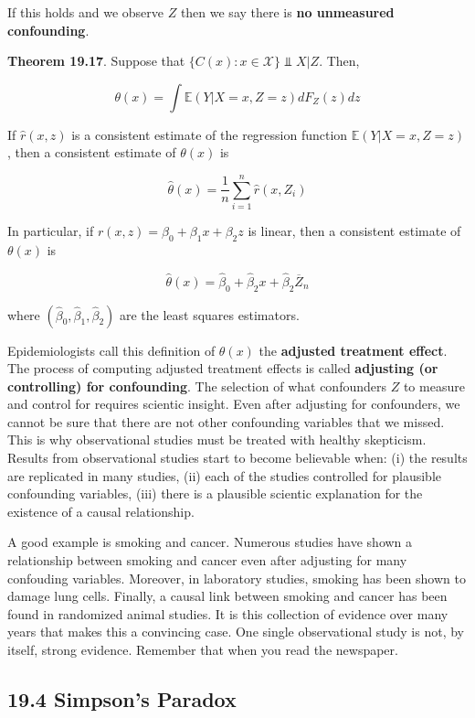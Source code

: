 If this holds and we observe \(Z\) then we say there is \textbf{no
unmeasured confounding}.

\textbf{Theorem 19.17}. Suppose that $ \{ C(x) : x \in \mathcal{X} \}
\text{ ⫫ } X |{} Z$. Then,

\[ \theta(x) = \int \mathbb{E}(Y | X = x, Z = z) d F_Z(z) dz \]

If \(\hat{r}(x, z)\) is a consistent estimate of the regression function
\(\mathbb{E}(Y | X = x, Z = z)\), then a consistent estimate of
\(\theta(x)\) is

\[ \hat{\theta}(x) = \frac{1}{n} \sum_{i=1}^{n} \hat{r}(x, Z_{i}) \]

In particular, if \(r(x, z) = \beta_{0} + \beta_{1} x + \beta_{2} z\) is
linear, then a consistent estimate of \(\theta(x)\) is

\[ \hat{\theta}(x) = \hat{\beta}_{0} + \hat{\beta}_{2} x + \hat{\beta}_{2} \overline{Z}_{n} \]

where \((\hat{\beta}_{0}, \hat{\beta}_{1}, \hat{\beta}_{2})\) are the least
squares estimators.

Epidemiologists call this definition of \(\theta(x)\) the
\textbf{adjusted treatment effect}. The process of computing adjusted
treatment effects is called \textbf{adjusting (or controlling) for
confounding}. The selection of what confounders \(Z\) to measure and
control for requires scientic insight. Even after adjusting for
confounders, we cannot be sure that there are not other confounding
variables that we missed. This is why observational studies must be
treated with healthy skepticism. Results from observational studies
start to become believable when: (i) the results are replicated in many
studies, (ii) each of the studies controlled for plausible confounding
variables, (iii) there is a plausible scientic explanation for the
existence of a causal relationship.

A good example is smoking and cancer. Numerous studies have shown a
relationship between smoking and cancer even after adjusting for many
confouding variables. Moreover, in laboratory studies, smoking has been
shown to damage lung cells. Finally, a causal link between smoking and
cancer has been found in randomized animal studies. It is this
collection of evidence over many years that makes this a convincing
case. One single observational study is not, by itself, strong evidence.
Remember that when you read the newspaper.

\subsection*{19.4 Simpson's Paradox}\label{simpsons-paradox}

